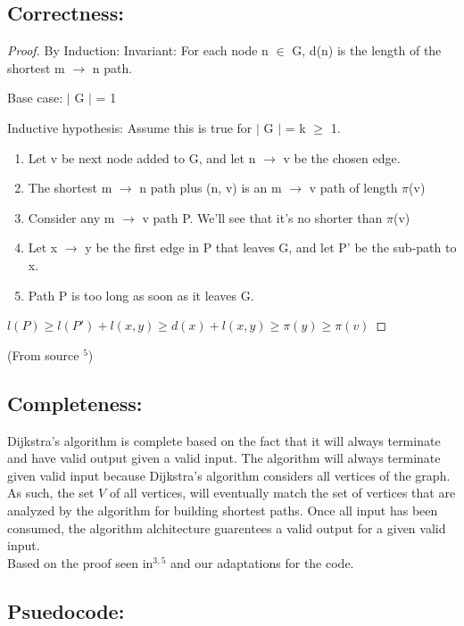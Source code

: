 \documentclass{article}
\begin{document}
\subsection{Correctness:} 

\begin{proof}
By Induction:
Invariant: For each node n $\in$ G, d(n) is the length of the shortest m $\rightarrow$ n path.

Base case: $\mid$ G $\mid$  = 1

Inductive hypothesis: Assume this is true for $\mid$ G $\mid$ = k $\geq$ 1.
\begin{enumerate}
\item Let v be next node added to G, and let n $\rightarrow$ v be the chosen edge.
\item The shortest m $\rightarrow$ n path plus (n, v) is an m $\rightarrow$ v path of length $\pi$(v)
\item Consider any m $\rightarrow$ v path P.
    We'll see that it's no shorter than $\pi$(v)
\item Let x $\rightarrow$ y be the first edge in P that leaves G, 
    and let P' be the sub-path to x.
\item Path P is too long as soon as it leaves G.
\end{enumerate}

$l(P) \geq l(P') + l(x,y) \geq d(x) + l(x,y) \geq \pi(y) \geq \pi(v)$
\end{proof}

(From source $^5$)


\subsection{Completeness:}
Dijkstra's algorithm is complete based on the fact that it will always terminate and have valid output given a valid input.
The algorithm will always terminate given valid input because Dijkstra's algorithm considers all vertices of the graph. As such, the set $V$ of all vertices, will eventually match the set of vertices that are analyzed by the algorithm for building shortest paths.  Once all input has been consumed, the algorithm alchitecture guarentees a valid output for a given valid input.
\\Based on the proof seen in$^{3,5}$ and our adaptations for the code.

\subsection{Psuedocode:}
\end{document}
